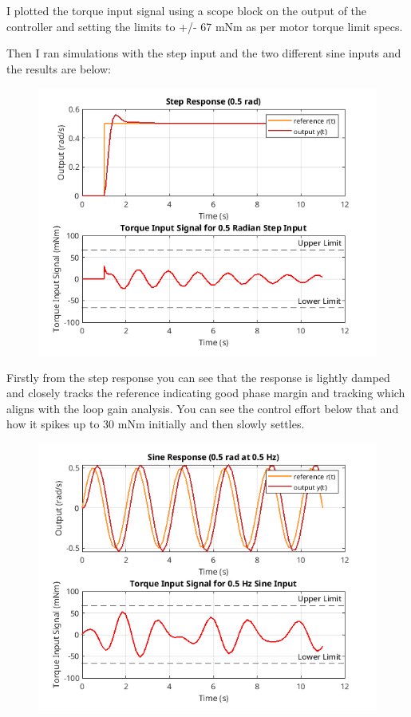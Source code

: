 \documentclass{article}
\begin{document}
I plotted the torque input signal using a scope block on the output of the controller and setting the limits to +/- 67 mNm as per motor torque limit specs.

Then I ran simulations with the step input and the two different sine inputs and the results are below:

\begin{figure}[H]
    \centering
    \includegraphics[width=\textwidth]{stepResponse.png}
    \label{fig:stepResponse}
\end{figure}

Firstly from the step response you can see that the response is lightly damped and closely tracks the reference indicating good phase margin and tracking which aligns with the loop gain analysis.
You can see the control effort below that and how it spikes up to 30 mNm initially and then slowly settles.

\begin{figure}[H]
    \centering
    \includegraphics[width=\textwidth]{halfSineResponse.png}
    \label{fig:halfSineResponse}
\end{figure}
\end{document}
